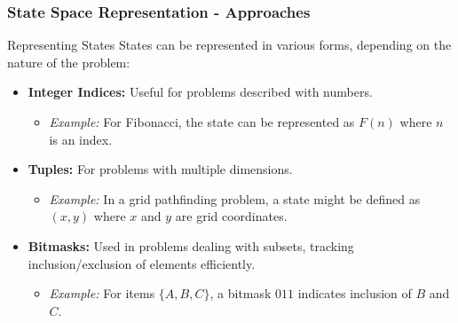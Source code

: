 \documentclass[aspectratio=169]{beamer}
\begin{document}
\begin{frame}[fragile]
    \frametitle{State Space Representation - Approaches}
    \begin{block}{Representing States}
        States can be represented in various forms, depending on the nature of the problem:
        \begin{itemize}
            \item \textbf{Integer Indices:} Useful for problems described with numbers.
            \begin{itemize}
                \item \textit{Example:} For Fibonacci, the state can be represented as $F(n)$ where $n$ is an index.
            \end{itemize}
            \item \textbf{Tuples:} For problems with multiple dimensions.
            \begin{itemize}
                \item \textit{Example:} In a grid pathfinding problem, a state might be defined as $(x, y)$ where $x$ and $y$ are grid coordinates.
            \end{itemize}
            \item \textbf{Bitmasks:} Used in problems dealing with subsets, tracking inclusion/exclusion of elements efficiently.
            \begin{itemize}
                \item \textit{Example:} For items $\{A, B, C\}$, a bitmask $011$ indicates inclusion of $B$ and $C$.
            \end{itemize}
        \end{itemize}
    \end{block}
\end{frame}
\end{document}
